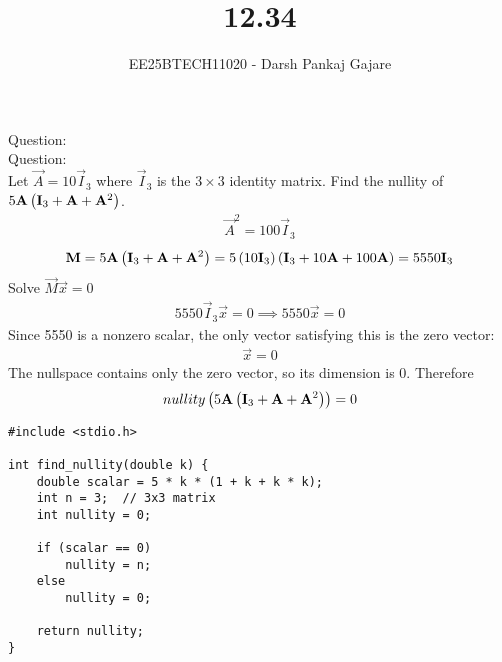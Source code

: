 \documentclass{beamer}
\let\solution\relax
\numberwithin{equation}{section}
\begin{document}
\title{12.34}
\author{EE25BTECH11020 - Darsh Pankaj Gajare}
{\let\newpage\relax\maketitle}
Question:\\


Question:\\ Let $\vec{A}=10\vec{I}_3$ where $\vec{I}_3$ is the $3\times3$ identity matrix. Find the nullity of $5\mathbf{A}\left(\mathbf{I}_3+\mathbf{A}+\mathbf{A}^2\right)$.
\solution
\begin{align}
	\vec{A}^2=100\vec{I}_3
\end{align}
\begin{align}
	\mathbf{M}=	5\mathbf{A}\left(\mathbf{I}_3+\mathbf{A}+\mathbf{A}^2\right)=5\left(10\mathbf{I}_3\right)\left(\mathbf{I}_3+10\mathbf{A}+100\mathbf{A}\right)=5550\mathbf{I}_3
\end{align}
Solve $\vec{M}\vec{x}=0$
\begin{align}
	5550\vec{I}_3\vec{x}=0 \implies 5550\vec{x}=0
\end{align}
Since 5550 is a nonzero scalar, the only vector satisfying this is the zero vector:
\begin{align}
	\vec{x}=0
\end{align}
The nullspace contains only the zero vector, so its dimension is 0. Therefore
\begin{align}
	nullity\left(5\mathbf{A}\left(\mathbf{I}_3+\mathbf{A}+\mathbf{A}^2\right)\right)=0
\end{align}
\begin{lstlisting}[caption=nullity.c]
#include <stdio.h>

int find_nullity(double k) {
    double scalar = 5 * k * (1 + k + k * k);
    int n = 3;  // 3x3 matrix
    int nullity = 0;

    if (scalar == 0)
        nullity = n;
    else
        nullity = 0;

    return nullity;
}
\end{lstlisting}
\end{document}
